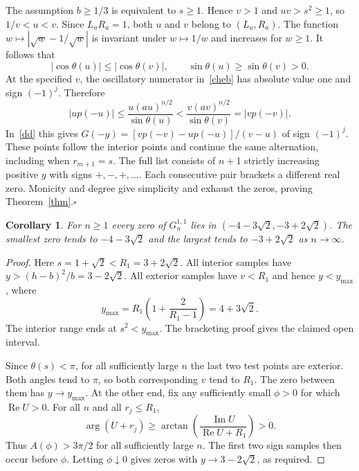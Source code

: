\documentclass[11pt]{article}
\newtheorem{corollary}[theorem]{Corollary}
\begin{document}
The assumption $b\ge1/3$ is equivalent to $s\ge1$. Hence $v>1$ and $uv>s^2\ge1$, so $1/v<u<v$. Since $L_aR_a=1$, both $u$ and $v$ belong to $(L_a,R_a)$. The function $w\mapsto |\sqrt{w}-1/\sqrt{w}|$ is invariant under $w\mapsto 1/w$ and increases for $w\ge1$. It follows that
\[
 |\cos\theta(u)|\le |\cos\theta(v)|,\qquad
 \sin\theta(u)\ge\sin\theta(v)>0 .
\]
At the specified $v$, the oscillatory numerator in~\eqref{cheb} has absolute value one and sign $(-1)^j$. Therefore
\[
 |u p(-u)|\le \frac{u(au)^{n/2}}{\sin\theta(u)}
 <\frac{v(av)^{n/2}}{\sin\theta(v)}
 =|v p(-v)|.
\]
In~\eqref{dd} this gives $G(-y)=[v p(-v)-u p(-u)]/(v-u)$ of sign $(-1)^j$. These points follow the interior points and continue the same alternation, including when $r_{m+1}=s$. The full list consists of $n+1$ strictly increasing positive $y$ with signs $+,-,+,\ldots$. Each consecutive pair brackets a different real zero. Monicity and degree give simplicity and exhaust the zeros, proving Theorem~\ref{thm}.\hfill$\square$

\begin{corollary}\label{edges}
For $n\ge1$ every zero of $G_n^{1,1}$ lies in $(-4-3\sqrt2,-3+2\sqrt2)$. The smallest zero tends to $-4-3\sqrt2$ and the largest tends to $-3+2\sqrt2$ as $n\to\infty$.
\end{corollary}
\begin{proof}
Here $s=1+\sqrt2<R_1=3+2\sqrt2$. All interior samples have $y>(h-b)^2/b=3-2\sqrt2$. All exterior samples have $v<R_1$ and hence $y<y_{\max}$, where
\[
 y_{\max}=R_1\left(1+\frac{2}{R_1-1}\right)=4+3\sqrt2.
\]
The interior range ends at $s^2<y_{\max}$. The bracketing proof gives the claimed open interval.

Since $\theta(s)<\pi$, for all sufficiently large $n$ the last two test points are exterior. Both angles tend to $\pi$, so both corresponding $v$ tend to $R_1$. The zero between them has $y\to y_{\max}$. At the other end, fix any sufficiently small $\phi>0$ for which $\operatorname{Re}U>0$. For all $n$ and all $r_j\le R_1$,
\[
 \arg(U+r_j)\ge
 \arctan\!\left(\frac{\operatorname{Im}U}{\operatorname{Re}U+R_1}\right)>0.
\]
Thus $A(\phi)>3\pi/2$ for all sufficiently large $n$. The first two sign samples then occur before $\phi$. Letting $\phi\downarrow0$ gives zeros with $y\to3-2\sqrt2$, as required.
\end{proof}
\end{document}

